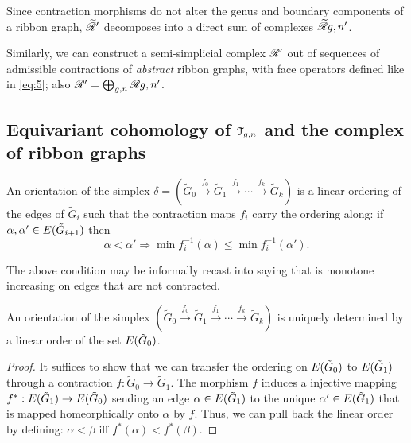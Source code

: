 Since contraction morphisms do not alter the genus and boundary
components of a ribbon graph, $\mathscr{\widetilde R}_{}'$ decomposes into a direct sum of
complexes $\mathscr{\widetilde R}_{}{g,n}'$.

Similarly, we can construct a semi-simplicial complex $\mathscr{R}_{}'$ out of
sequences of admissible contractions of \emph{abstract} ribbon graphs,
with face operators defined like in \eqref{eq:5}; also $\mathscr{R}_{}' = \bigoplus_{g,n}
\mathscr{R}_{}{g,n}'$.


\subsection{Equivariant cohomology of $\mathcal{T}_{g,n}$ and the complex of ribbon graphs}
\label{sec:rg-complex}

\begin{definition}
  An orientation of the simplex $\delta = ({\tilde G}_0 \overset{f_0}\to {\tilde
    G}_1 \overset{f_1}\to \cdots \overset{f_k}\to {\tilde G}_k)$ is a linear
  ordering of the edges of ${\tilde G}_i$ such that the contraction maps
  $f_i$ carry the ordering along: if $\alpha, \alpha' \in E({\tilde G}_{i+1})$ then
  \begin{equation*}
    \alpha < \alpha' \Rightarrow \min f_i^{-1}(\alpha) \leq \min f_i^{-1}(\alpha').
  \end{equation*}
\end{definition}
The above condition may be informally recast into saying that is
monotone increasing on edges that are not contracted.
\begin{lemma}
  An orientation of the simplex $({\tilde G}_0 \overset{f_0}\to {\tilde
    G}_1 \overset{f_1}\to \cdots \overset{f_k}\to {\tilde G}_k)$ is uniquely
  determined by a linear order of the set $E({\tilde G}_0)$.
\end{lemma}
\begin{proof}
  It suffices to show that we can transfer the ordering on
  $E({\tilde G}_0)$ to $E({\tilde G}_1)$ through a
  contraction $f: {\tilde G}_0 \to {\tilde G}_1$.
  The morphism $f$ induces a injective mapping $f^*: E({\tilde
      G}_1) \to E({\tilde G}_0)$ sending an edge $\alpha \in
  E({\tilde G}_1)$ to the unique $\alpha' \in E({\tilde G}_1)$ that
  is mapped homeorphically onto $\alpha$ by $f$.  Thus, we can pull back
  the linear order by defining: $\alpha < \beta$ iff $f^*(\alpha) < f^*(\beta)$. 
\end{proof}


